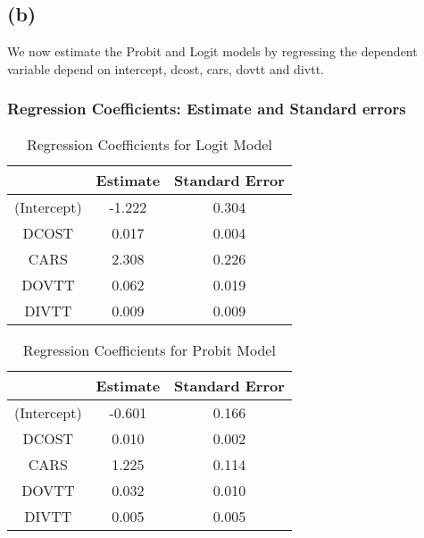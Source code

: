 \documentclass[a4paper]{article}
\begin{document}
\subsection*{(b)}
We now estimate the Probit and Logit models by regressing the dependent variable depend on intercept, dcost, cars, dovtt and divtt.

\pagebreak 
\subsubsection*{Regression Coefficients: Estimate and Standard errors}
\begin{table}[h!]
    \centering
    \begin{tabular}{|ccc|}
    \hline
    \textbf{}   & \textbf{Estimate} & \textbf{Standard Error} \\ \hline
    (Intercept) & -1.222             & 0.304            \\ %
    DCOST       & 0.017           & 0.004       \\ %
    CARS        & 2.308          & 0.226        \\ %
    DOVTT       & 0.062         &   0.019                \\ %
    DIVTT       & 0.009           & 0.009                  \\ \hline
    \end{tabular}
    \caption{Regression Coefficients for Logit Model}
    \label{tab:table1}
    \end{table}

\begin{table}[h!]
        \centering
        \begin{tabular}{|ccc|}
        \hline
        \textbf{}   & \textbf{Estimate} & \textbf{Standard Error} \\ \hline
        (Intercept) & -0.601             & 0.166           \\ %
        DCOST       & 0.010           & 0.002       \\ %
        CARS        & 1.225          & 0.114       \\ %
        DOVTT       & 0.032        &   0.010               \\ %
        DIVTT       & 0.005           & 0.005                  \\ \hline
        \end{tabular}
        \caption{Regression Coefficients for Probit Model}
        \label{tab:table2}
\end{table}
\end{document}
